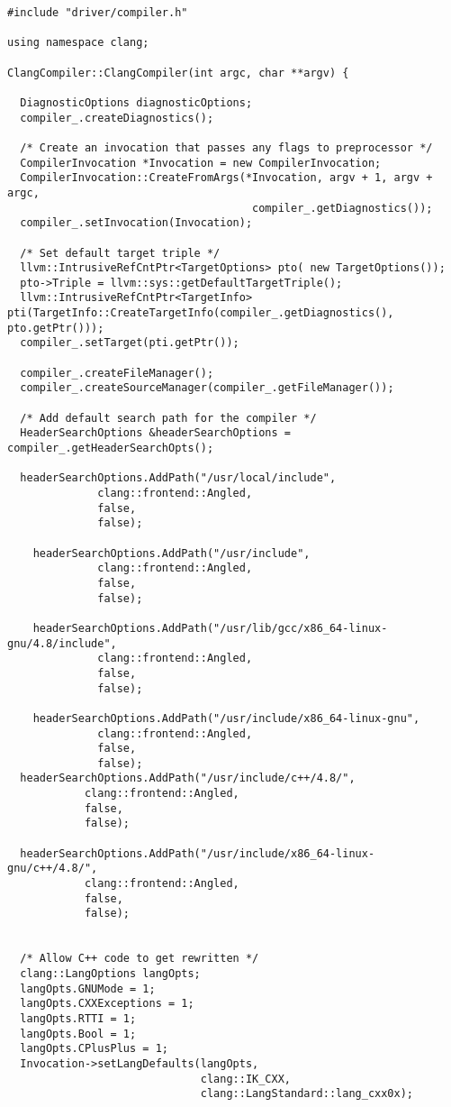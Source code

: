 \documentclass[a4paper,11pt,twoside]{book}
\begin{document}
\begin{lstlisting}[language=CCC, caption=driver/compiler.cpp]
#include "driver/compiler.h"

using namespace clang;

ClangCompiler::ClangCompiler(int argc, char **argv) {

  DiagnosticOptions diagnosticOptions;
  compiler_.createDiagnostics();

  /* Create an invocation that passes any flags to preprocessor */
  CompilerInvocation *Invocation = new CompilerInvocation;
  CompilerInvocation::CreateFromArgs(*Invocation, argv + 1, argv + argc,
                                      compiler_.getDiagnostics());
  compiler_.setInvocation(Invocation);

  /* Set default target triple */
  llvm::IntrusiveRefCntPtr<TargetOptions> pto( new TargetOptions());
  pto->Triple = llvm::sys::getDefaultTargetTriple();
  llvm::IntrusiveRefCntPtr<TargetInfo> pti(TargetInfo::CreateTargetInfo(compiler_.getDiagnostics(), pto.getPtr()));
  compiler_.setTarget(pti.getPtr());

  compiler_.createFileManager();
  compiler_.createSourceManager(compiler_.getFileManager());

  /* Add default search path for the compiler */
  HeaderSearchOptions &headerSearchOptions = compiler_.getHeaderSearchOpts();

  headerSearchOptions.AddPath("/usr/local/include",
	          clang::frontend::Angled,
	          false,
	          false);

	headerSearchOptions.AddPath("/usr/include",
	          clang::frontend::Angled,
	          false,
	          false);

	headerSearchOptions.AddPath("/usr/lib/gcc/x86_64-linux-gnu/4.8/include",
	          clang::frontend::Angled,
	          false,
	          false);

	headerSearchOptions.AddPath("/usr/include/x86_64-linux-gnu",
	          clang::frontend::Angled,
	          false,
	          false);
  headerSearchOptions.AddPath("/usr/include/c++/4.8/",
            clang::frontend::Angled,
            false,
            false);

  headerSearchOptions.AddPath("/usr/include/x86_64-linux-gnu/c++/4.8/",
            clang::frontend::Angled,
            false,
            false);


  /* Allow C++ code to get rewritten */
  clang::LangOptions langOpts;
  langOpts.GNUMode = 1; 
  langOpts.CXXExceptions = 1; 
  langOpts.RTTI = 1; 
  langOpts.Bool = 1; 
  langOpts.CPlusPlus = 1; 
  Invocation->setLangDefaults(langOpts,
                              clang::IK_CXX,
                              clang::LangStandard::lang_cxx0x);


\end{lstlisting}
\end{document}
